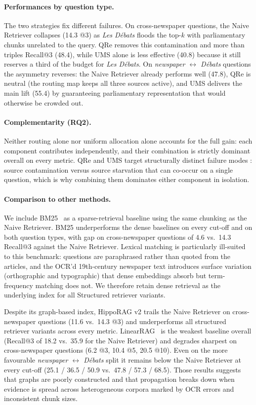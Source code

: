 \paragraph{Performances by question type.}
The two strategies fix different failures. On cross-newspaper
questions, the Naive Retriever collapses (14.3 @3) as \textit{Les Débats}
floods the top-$k$ with parliamentary chunks unrelated to the query. QRe
removes this contamination and more than triples Recall@3 (48.4), while UMS alone
is less effective (40.8) because it still reserves a third of the budget
for \textit{Les Débats}. On \emph{newspaper $\leftrightarrow$ Débats} questions
the asymmetry reverses: the Naive Retriever already performs well (47.8),
QRe is neutral (the routing map keeps all three sources active), and UMS
delivers the main lift (55.4) by guaranteeing parliamentary representation
that would otherwise be crowded out.

\paragraph{Complementarity (RQ2).}
Neither routing alone nor uniform allocation alone accounts for the full
gain: each component contributes independently, and their combination is
strictly dominant overall on every metric. QRe and UMS target structurally distinct
failure modes : source contamination versus source starvation that can co-occur on a single question, which is why combining them
dominates either component in isolation.


\paragraph{Comparison to other methods.}
We include BM25~\cite{bm25} as a sparse-retrieval baseline using the same chunking
as the Naive Retriever. BM25 underperforms the dense baselines on every
cut-off and on both question types, with gap on cross-newspaper questions of 4.6 vs.\ 14.3 Recall@3 against the
Naive Retriever. Lexical matching is particularly ill-suited to this
benchmark: questions are paraphrased rather than quoted from the
articles, and the OCR'd 19th-century newspaper text introduces surface
variation (orthographic and typographic) that dense embeddings absorb
but term-frequency matching does not. We therefore retain dense
retrieval as the underlying index for all Structured retriever variants.

Despite its graph-based index, HippoRAG v2 trails the Naive Retriever on cross-newspaper questions (11.6 vs.\ 14.3 @3) and underperforms all structured retriever variants across every metric. LinearRAG~\cite{linearrag_2025} is the weakest baseline
overall (Recall@3 of 18.2 vs.\ 35.9 for the Naive Retriever) and degrades
sharpest on cross-newspaper questions (6.2 @3, 10.4 @5, 20.5 @10). Even on the
more favourable \emph{newspaper $\leftrightarrow$ D\'ebats} split it remains
below the Naive Retriever at every cut-off (25.1 / 36.5 / 50.9 vs.\ 47.8 / 57.3 / 68.5). Those results suggests that graphs are poorly constructed and that propagation breaks down when evidence is spread across heterogeneous corpora marked by OCR errors and inconsistent chunk sizes.

